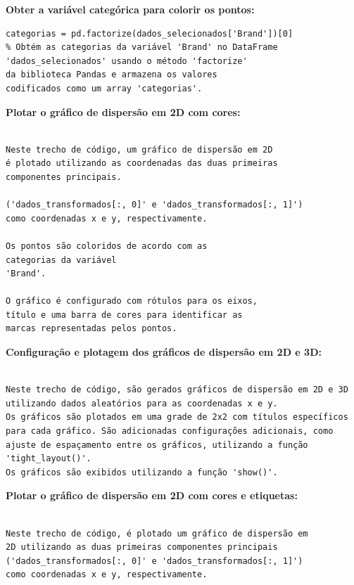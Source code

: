 \documentclass[12pt, a4paper]{article}
\begin{document}
\begin{enumerate}
\textbf{Obter a variável categórica para colorir os pontos:}

\begin{verbatim}
categorias = pd.factorize(dados_selecionados['Brand'])[0] 
% Obtém as categorias da variável 'Brand' no DataFrame 
'dados_selecionados' usando o método 'factorize' 
da biblioteca Pandas e armazena os valores 
codificados como um array 'categorias'.
\end{verbatim}

\textbf{Plotar o gráfico de dispersão em 2D com cores:}

\begin{verbatim}

Neste trecho de código, um gráfico de dispersão em 2D 
é plotado utilizando as coordenadas das duas primeiras 
componentes principais.

('dados_transformados[:, 0]' e 'dados_transformados[:, 1]')
como coordenadas x e y, respectivamente.

Os pontos são coloridos de acordo com as 
categorias da variável 
'Brand'.

O gráfico é configurado com rótulos para os eixos, 
título e uma barra de cores para identificar as 
marcas representadas pelos pontos.

\end{verbatim}

\textbf{Configuração e plotagem dos gráficos de dispersão em 2D e 3D:}

\begin{verbatim}

Neste trecho de código, são gerados gráficos de dispersão em 2D e 3D utilizando dados aleatórios para as coordenadas x e y.
Os gráficos são plotados em uma grade de 2x2 com títulos específicos para cada gráfico. São adicionadas configurações adicionais, como ajuste de espaçamento entre os gráficos, utilizando a função 'tight_layout()'.
Os gráficos são exibidos utilizando a função 'show()'.

\end{verbatim}


\textbf{Plotar o gráfico de dispersão em 2D com cores e etiquetas:}

\begin{verbatim}

Neste trecho de código, é plotado um gráfico de dispersão em 
2D utilizando as duas primeiras componentes principais
('dados_transformados[:, 0]' e 'dados_transformados[:, 1]') 
como coordenadas x e y, respectivamente.


\end{verbatim}
\end{enumerate}
\end{document}
